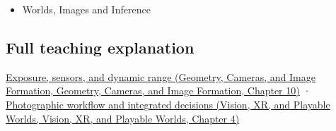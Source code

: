 \begin{itemize}
\tightlist
\item
  {Worlds, Images and Inference}
\end{itemize}

\subsection{Full teaching explanation}\label{appendix-92d45cdf2afc-full-teaching-explanation}

\href{../03-Geometry-Cameras-and-Image-Formation/main.pdf\#nameddest=03-visual-computing-i-ch003-exposure-sensors-and-dynamic-range}{Exposure, sensors, and dynamic range (Geometry, Cameras, and Image Formation, Geometry, Cameras, and Image Formation, Chapter 10)} · \href{../07-Vision-XR-and-Playable-Worlds/main.pdf\#nameddest=04-visual-computing-ii-ch034-photographic-workflow-and-integrated-decisions}{Photographic workflow and integrated decisions (Vision, XR, and Playable Worlds, Vision, XR, and Playable Worlds, Chapter 4)}
